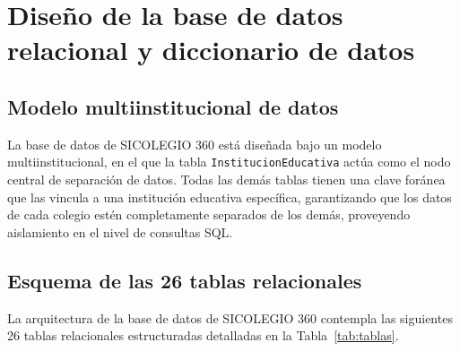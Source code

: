 \documentclass[12pt,a4paper,oneside]{report}
\begin{document}
\section{Diseño de la base de datos relacional y diccionario de datos}

\subsection{Modelo multiinstitucional de datos}
La base de datos de SICOLEGIO 360 está diseñada bajo un modelo multiinstitucional, en el que la tabla \texttt{InstitucionEducativa} actúa como el nodo central de separación de datos. Todas las demás tablas tienen una clave foránea que las vincula a una institución educativa específica, garantizando que los datos de cada colegio estén completamente separados de los demás, proveyendo aislamiento en el nivel de consultas SQL.

\subsection{Esquema de las 26 tablas relacionales}
La arquitectura de la base de datos de SICOLEGIO 360 contempla las siguientes 26 tablas relacionales estructuradas detalladas en la Tabla~\ref{tab:tablas}.
\end{document}
